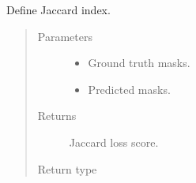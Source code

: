 \documentclass[letterpaper,10pt,english]{sphinxmanual}
\begin{document}
\begin{fulllineitems}
\label{\detokenize{engine/metrics:engine.metrics.jaccard_loss}}
Define Jaccard index.
\begin{quote}\begin{description}
\item[{Parameters}] \leavevmode\begin{itemize}
\item {} 
 \textendash{} Ground truth masks.

\item {} 
 \textendash{} Predicted masks.

\end{itemize}

\item[{Returns}] \leavevmode
{} \textendash{} Jaccard loss score.

\item[{Return type}] \leavevmode
{}

\end{description}\end{quote}

\end{fulllineitems}

\end{document}
